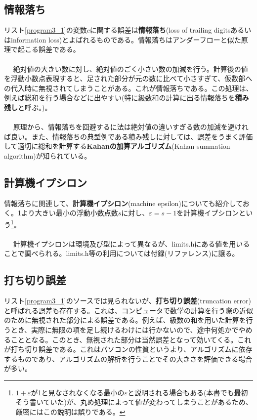 \subsection{情報落ち}
リスト\ref{program3_1}の変数$c$に関する誤差は\textbf{情報落ち}(loss of trailing digitsあるいはinformation loss)とよばれるものである。情報落ちはアンダーフローと似た原理で起こる誤差である。
\\ \\　
絶対値の大きい数に対し、絶対値のごく小さい数の加減を行う。計算後の値を浮動小数点表現すると、足された部分が元の数に比べて小さすぎて、仮数部への代入時に無視されてしまうことがある。これが情報落ちである。この処理は、例えば総和を行う場合などに出やすい(特に級数和の計算に出る情報落ちを\textbf{積み残し}と呼ぶ。)。
\\ \\　
原理から、情報落ちを回避するに法は絶対値の違いすぎる数の加減を避ければ良い。また、情報落ちの典型例である積み残しに対しては、誤差をうまく評価して適切に総和を計算する\textbf{Kahanの加算アルゴリズム}(Kahan summation algorithm)が知られている。

\subsection{計算機イプシロン}
情報落ちに関連して、\textbf{計算機イプシロン}(machine epsilon)についても紹介しておく。1より大きい最小の浮動小数点数$s$に対し、$\varepsilon=s-1$を計算機イプシロンという\footnote{$1+\varepsilon$が1と見なされなくなる最小の$\varepsilon$と説明される場合もある(本書でも最初そう書いていた)が、丸め処理によって値が変わってしまうことがあるため、厳密にはこの説明は誤りである。}。
\\ \\　
計算機イプシロンは環境及び型によって異なるが、limits.hにある値を用いることで調べられる。limits.h等の利用については付録(リファレンス)に譲る。

\subsection{打ち切り誤差}
リスト\ref{program3_1}のソースでは見られないが、\textbf{打ち切り誤差}(truncation error)と呼ばれる誤差も存在する。これは、コンピュータで数学の計算を行う際の近似のために無視された部分による誤差である。例えば、級数の和を用いた計算を行うとき、実際に無限の項を足し続けるわけには行かないので、途中何処かでやめることとなる。このとき、無視された部分は当然誤差となって効いてくる。これが打ち切り誤差である。これはパソコンの性質というより、アルゴリズムに依存するものであり、アルゴリズムの解析を行うことでその大きさを評価できる場合が多い。


